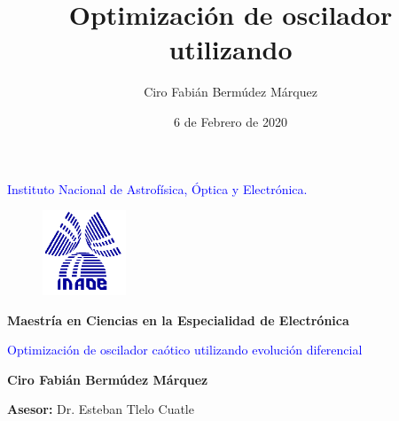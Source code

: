 \documentclass[10pt]{beamer}
\author{Ciro Fabián Bermúdez Márquez}
\title{Optimización de oscilador utilizando }
\institute{Benemérita Universidad Autónoma de Puebla} \date{6 de Febrero de 2020}
\begin{document}
	\begin{frame}[plain]
	
		
		\begin{center}
			\textcolor{blue}{Instituto Nacional de Astrofísica, Óptica y Electrónica.}
		\end{center}
		
		\begin{figure}[hbtp]
			\centering
			\includegraphics[width = 2.5cm]{logoinaoe.png} 
		\end{figure}
		
		\begin{center}
			\textbf{Maestría en Ciencias en la Especialidad de Electrónica}
		\end{center}
						
		\begin{center}
			\begin{Large}
			\textcolor{blue}{Optimización de oscilador caótico utilizando evolución diferencial}
			\end{Large}
		\end{center}
		
		\begin{center}
			\textbf{Ciro Fabián Bermúdez Márquez }
		\end{center}
		
		\begin{center}
			\textbf{Asesor:} Dr. Esteban Tlelo Cuatle
		\end{center}
	\end{frame}
	\begin{frame}
		\tableofcontents
	\end{frame}
\end{document}
